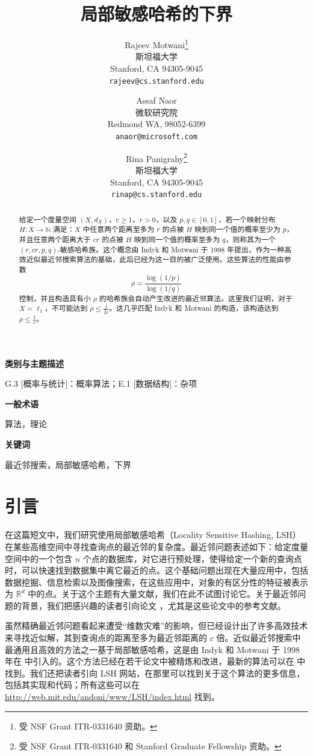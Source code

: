 \documentclass[10pt,twocolumn]{ctexart}
\title{局部敏感哈希的下界}
\author{
Rajeev Motwani\thanks{受 NSF Grant ITR-0331640 资助。}\\
斯坦福大学\\
Stanford, CA 94305-9045\\
\texttt{rajeev@cs.stanford.edu}
\and
Assaf Naor\\
微软研究院\\
Redmond WA, 98052-6399\\
\texttt{anaor@microsoft.com}
\and
Rina Panigrahy\thanks{受 NSF Grant ITR-0331640 和 Stanford Graduate Fellowship 资助。}\\
斯坦福大学\\
Stanford, CA 94305-9045\\
\texttt{rinap@cs.stanford.edu}
}
\date{}
\begin{document}
\maketitle

\begin{abstract}
给定一个度量空间 $(X,d_X)$，$c\ge 1$，$r>0$，以及 $p,q\in[0,1]$，若一个映射分布 $H:X\to\mathbb{N}$ 满足：$X$ 中任意两个距离至多为 $r$ 的点被 $H$ 映到同一个值的概率至少为 $p$，并且任意两个距离大于 $cr$ 的点被 $H$ 映到同一个值的概率至多为 $q$，则称其为一个 $(r,cr,p,q)$-敏感哈希族。这个概念由 Indyk 和 Motwani 于 1998 年提出，作为一种高效近似最近邻搜索算法的基础，此后已经为这一目的被广泛使用。这些算法的性能由参数
\[
\rho=\frac{\log(1/p)}{\log(1/q)}
\]
控制，并且构造具有小 $\rho$ 的哈希族会自动产生改进的最近邻算法。这里我们证明，对于 $X=\ell_1$，不可能达到 $\rho\le \frac{1}{2c}$。这几乎匹配 Indyk 和 Motwani 的构造，该构造达到 $\rho\le \frac{1}{c}$。
\end{abstract}

\noindent\textbf{类别与主题描述}

G.3 [概率与统计]：概率算法；E.1 [数据结构]：杂项

\medskip
\noindent\textbf{一般术语}

算法，理论

\medskip
\noindent\textbf{关键词}

最近邻搜索，局部敏感哈希，下界

\section{引言}

在这篇短文中，我们研究使用局部敏感哈希（Locality Sensitive Hashing, LSH）在某些高维空间中寻找查询点的最近邻的复杂度。最近邻问题表述如下：给定度量空间中的一个包含 $n$ 个点的数据库，对它进行预处理，使得给定一个新的查询点时，可以快速找到数据集中离它最近的点。这个基础问题出现在大量应用中，包括数据挖掘、信息检索以及图像搜索，在这些应用中，对象的有区分性的特征被表示为 $\mathbb{R}^d$ 中的点。关于这个主题有大量文献，我们在此不试图讨论它。关于最近邻问题的背景，我们把感兴趣的读者引向论文 \cite{IM98,HP01,DIM04,Pan06}，尤其是这些论文中的参考文献。

虽然精确最近邻问题看起来遭受“维数灾难”的影响，但已经设计出了许多高效技术来寻找近似解，其到查询点的距离至多为最近邻距离的 $c$ 倍。近似最近邻搜索中最通用且高效的方法之一基于局部敏感哈希，这是由 Indyk 和 Motwani 于 1998 年在 \cite{IM98} 中引入的。这个方法已经在若干论文中被精炼和改进，最新的算法可以在 \cite{DIM04} 中找到。我们还把读者引向 LSH 网站，在那里可以找到关于这个算法的更多信息，包括其实现和代码；所有这些可以在 \url{http://web.mit.edu/andoni/www/LSH/index.html} 找到。
\end{document}
